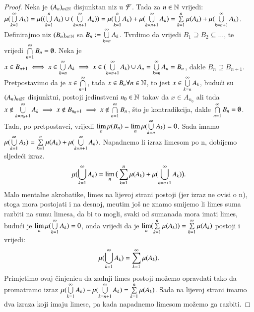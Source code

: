 \begin{proof}
    Neka je $(A_n)_{n \in \mathbb{N}}$ disjunktan niz u $\mathcal{F}$. Tada za $n \in \mathbb{N}$ vrijedi:
    $\mu({\bigcup\limits_{k=1}^{\infty} A_k}) = \mu({(\bigcup\limits_{k=1}^{n} A_k) \cup
    (\bigcup\limits_{k=n+1}^{\infty} A_k)}) = \mu({\bigcup\limits_{k=1}^{n} A_k})
    + \mu({\bigcup\limits_{k=n+1}^{\infty} A_k}) = \sum\limits_{k=1}^{n} \mu({A_k})
    + \mu({\bigcup\limits_{k=n+1}^{\infty} A_k})$.
    Definirajmo niz $(B_n)_{n \in \mathbb{N}}$ sa $B_n := \bigcup\limits_{k=n}^{\infty} A_k$.
    Tvrdimo da vrijedi $B_1 \supseteq B_2 \subseteq \dots$, te vrijedi
    $\bigcap\limits_{n=1}^{\infty} B_n = \emptyset$.
    Neka je $x \in B_{n+1} \iff x \in \bigcup\limits_{k=n}^{\infty} A_k \implies x \in
    (\bigcup\limits_{k=n+1}^{\infty} A_k) \cup A_n = \bigcup\limits_{k=n}^{\infty} A_n = B_n$, dakle
    $B_n \supseteq B_{n+1}$.
    Pretpostavimo da je $x \in \bigcap\limits_{n=1}^{\infty}$, tada $x \in B_n \forall n \in \mathbb{N}$,
    to jest $x \in \bigcup\limits_{k=n}^{\infty} A_k$, budu\' ci su $(A_n)_{n \in \mathbb{N}}$ disjunktni,
    postoji jedinstveni $n_0 \in \mathbb{N}$ takav da $x \in A_{n_0}$ ali tada $x \notin
    \bigcup\limits_{k=n_0+1}^{\infty} A_k \implies x \notin B_{n_0+1} \implies x \notin
    \bigcap\limits_{n=1}^{\infty} B_n$, \v sto je kontradikcija, dakle $\bigcap\limits_{n=1}^{\infty}
    B_n = \emptyset$.
    Tada, po pretpostavci, vrijedi $\lim\limits_n \mu({B_n}) = \lim\limits_n
    \mu({\bigcup\limits_{k=n}^{\infty} A_k}) = 0$.
    Sada imamo $\mu({\bigcup\limits_{k=1}^{\infty} A_k}) = \sum\limits_{k=1}^{n} \mu({A_k})
    + \mu({\bigcup\limits_{k=n+1}^{\infty} A_k})$. Napadnemo li izraz limesom po n, dobijemo
    sljede\' ci izraz.
    \begin{equation*}
        \mu({\bigcup\limits_{k=1}^{\infty} A_k}) = \lim\limits_n \big( \sum\limits_{k=1}^{n}
        \mu({A_k}) + \mu({\bigcup\limits_{k=n+1}^{\infty} A_k}) \big).
    \end{equation*}
    Malo mentalne akrobatike, limes na lijevoj strani postoji (jer izraz ne ovisi o n),
    stoga mora postojati i na desnoj, me\dj utim jo\v s ne znamo smijemo li limes suma
    razbiti na sumu limesa, da bi to mogli, svaki od sumanada mora imati limes, budu\'
    ci je $\lim\limits_n \mu({\bigcup\limits_{k=1}^{\infty}A_k}) = 0$, onda vrijedi da je
    $\lim\limits_n (\sum\limits_{k=1}^{n} \mu({A_k})) = \sum\limits_{k=1}^{\infty} \mu({A_k})$
    postoji i vrijedi:
    \begin{equation*}
        \mu({\bigcup\limits_{k=1}^{\infty} A_k}) = \sum\limits_{k=1}^{\infty} \mu({A_k}).
    \end{equation*}
    Primjetimo ovaj \v cinjenicu da zadnji limes postoji mo\v zemo opravdati tako
    da promatramo izraz $\mu({\bigcup\limits_{k=1}^{\infty} A_k})
    - \mu({\bigcup\limits_{k=n+1}^{\infty} A_k}) = \sum\limits_{k=1}^{n} \mu({A_k})$. Sada na lijevoj strani
    imamo dva izraza koji imaju limese, pa kada napadnemo limesom mo\v zemo ga razbiti.

\end{proof}